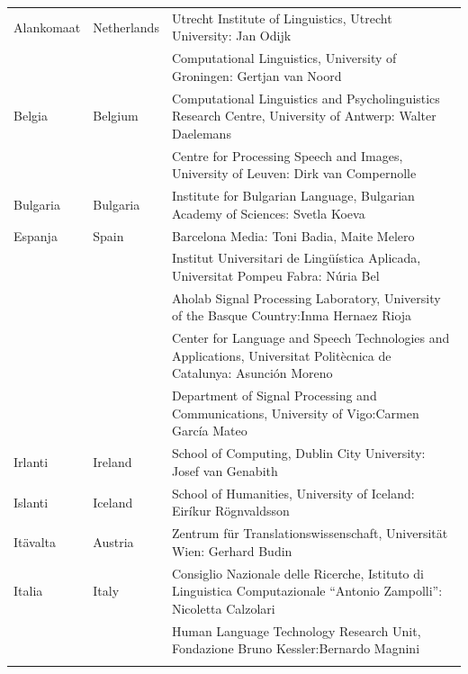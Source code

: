 \begin{longtable}{@{}llp{113mm}@{}}
Alankomaat & \textcolor{grey1}{Netherlands} & Utrecht Institute of Linguistics, Utrecht University: Jan Odijk\\ \addlinespace 
  & & Computational Linguistics, University of Groningen: Gertjan van Noord\\ \addlinespace
Belgia & \textcolor{grey1}{Belgium} & Computational Linguistics and Psycholinguistics Research Centre, University of Antwerp: Walter Daelemans\\ \addlinespace
  & & Centre for Processing Speech and Images, University of Leuven: Dirk van Compernolle \\ \addlinespace
Bulgaria & \textcolor{grey1}{Bulgaria} & Institute for Bulgarian Language, Bulgarian Academy of Sciences: Svetla Koeva \\ \addlinespace
Espanja & \textcolor{grey1}{Spain} & Barcelona Media: Toni Badia, Maite Melero \\ \addlinespace 
  & & Institut Universitari de Lingüística Aplicada, Universitat Pompeu Fabra: Núria Bel \\ \addlinespace 
  & & Aholab Signal Processing Laboratory, University of the Basque Country:\newline Inma Hernaez Rioja \\ \addlinespace 
  & & Center for Language and Speech Technologies and Applications, Universitat Politècnica de Catalunya:  Asunción Moreno \\ \addlinespace 
  & & Department of Signal Processing and Communications, University of Vigo:\newline Carmen García Mateo \\ \addlinespace 
Irlanti & \textcolor{grey1}{Ireland} & School of Computing, Dublin City University: Josef van Genabith\\ \addlinespace
Islanti & \textcolor{grey1}{Iceland} & School of Humanities, University of Iceland: Eiríkur Rögnvaldsson\\ \addlinespace
Itävalta & \textcolor{grey1}{Austria} & Zentrum für Translationswissenschaft, Universität Wien: Gerhard Budin\\ \addlinespace 
Italia & \textcolor{grey1}{Italy} & Consiglio Nazionale delle Ricerche, Istituto di Linguistica Computazionale “Antonio Zampolli”: Nicoletta Calzolari\\ \addlinespace
  & & Human Language Technology Research Unit, Fondazione Bruno Kessler:\newline Bernardo Magnini\\ \addlinespace 

\end{longtable}
